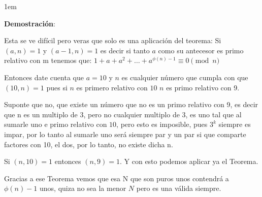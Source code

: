 \documentclass[12pt, fleqn]{article}                             %
\newenvironment{SmallIndentation}[1][0.75em]                    %
    {\begin{adjustwidth}{#1}{}\begin{footnotesize}}                 %
    {\end{footnotesize}\end{adjustwidth}}                           %
\begin{document}
    \begin{SmallIndentation}[1em]
        \textbf{Demostración}:
        
        Esta se ve difícil pero veras que solo es una aplicación del teorema:
        Si $(a, n) = 1$ y $(a-1, n) = 1$ es decir si tanto $a$ como su antecesor es primo
        relativo con m tenemos que:
        $1 + a + a^2 + \dots + a^{\phi(n)-1} \equiv 0 \pmod{n}$

        Entonces date cuenta que $a = 10$ y $n$ es cualquier número que cumpla con que $(10, n) = 1$
        pues si $n$ es primero relativo con $10$ $n$ es primo relativo con 9.

        Suponte que no, que existe un número que no es un primo relativo con 9, es decir que n
        es un multiplo de 3, pero no cualquier multiplo de 3, es uno tal que al sumarle uno e primo
        relativo con $10$, pero esto es imposible, pues $3^k$ siempre es impar, por lo tanto al sumarle uno 
        será siempre par y un par si que comparte factores con 10, el dos, por lo tanto, no existe dicha
        n.

        Si $(n,10)=1$ entonces $(n,9)=1$. Y con esto podemos aplicar ya el Teorema.

        Gracias a ese Teorema vemos que esa N que son puros unos contendrá a $\phi(n)-1$ unos, quiza
        no sea la menor $N$ pero es una válida siempre.
            
    
    \end{SmallIndentation}
        
\end{document}
